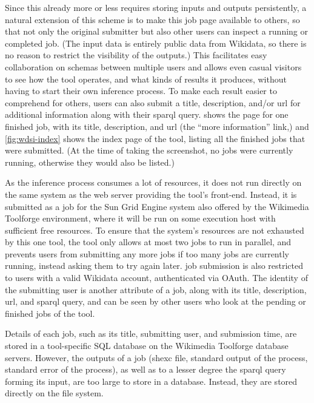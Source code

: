 Since this already more or less requires storing inputs and outputs persistently,
a natural extension of this scheme is to make this \gls{job} page available to others,
so that not only the original submitter but also other users can inspect a running or completed \gls{job}.
(The input data is entirely public data from \gls{Wikidata},
so there is no reason to restrict the visibility of the outputs.)
This facilitates easy collaboration on \glspl{schema} between multiple users
and allows even casual visitors to see how the tool operates,
and what kinds of results it produces,
without having to start their own inference process.
To make each result easier to comprehend for others,
users can also submit a title, description, and/or \gls{url} for additional information
along with their \gls{sparql} query.
 shows the page for one finished \gls{job},
with its title, description, and \gls{url} (the “more information” link,)
and \cref{fig:wdsi-index} shows the index page of the tool,
listing all the finished jobs that were submitted.
(At the time of taking the screenshot,
no jobs were currently running,
otherwise they would also be listed.)

As the inference process consumes a lot of resources,
it does not run directly on the same system as the web server providing the tool’s front-end.
Instead, it is submitted as a job for the Sun Grid Engine system also offered by the \gls{Wikimedia Toolforge} environment,
where it will be run on some execution host with sufficient free resources.
To ensure that the system’s resources are not exhausted by this one tool,
the tool only allows at most two \glspl{job} to run in parallel,
and prevents users from submitting any more \glspl{job} if too many \glspl{job} are currently running,
instead asking them to try again later.
\Gls{job} submission is also restricted to users with a valid \gls{Wikidata} account,
authenticated via OAuth.
The identity of the submitting user is another attribute of a \gls{job},
along with its title, description, \gls{url}, and \gls{sparql} query,
and can be seen by other users who look at the pending or finished \glspl{job} of the tool.

Details of each \gls{job},
such as its title, submitting user, and submission time,
are stored in a tool-specific SQL database on the \gls{Wikimedia Toolforge} database servers.
However, the outputs of a \gls{job}
(\gls{shexc} file, standard output of the process, standard error of the process),
as well as to a lesser degree the \gls{sparql} query forming its input,
are too large to store in a database.
Instead, they are stored directly on the file system.

